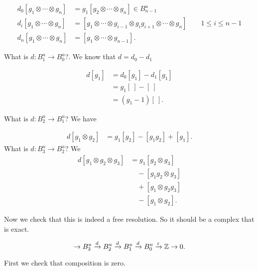 \begin{align*}
    d_0[g_1 \otimes \cdots \otimes g_n] &= g_1 [ g_2 \otimes \cdots \otimes g_n] \in B^u_{n-1}\\
    d_i[g_1 \otimes \cdots \otimes g_n] &= [g_1 \otimes \cdots \otimes g_{i-1} \otimes g_i g_{i+1} \otimes \cdots \otimes g_n] \qquad 1 \le i \le  n-1\\
    d_n[g_1 \otimes \cdots \otimes g_n] &= [g_1 \otimes \cdots \otimes g_{n-1}]
.\end{align*}

\begin{eg}
    What is $d: B^u_1 \to  B^u_0$?. We know that $d = d_0 - d_1$

    \begin{align*}
        d[g_1] &= d_0 [g_1] - d_1[g_1]\\
               &= g_1[\ ] - [\ ]\\
               &= (g_1 - 1)[\ ]
    .\end{align*} 

    What is $d: B^u_2 \to  B^u_1$? We have
    
    \begin{align*}
        d[g_1 \otimes g_2] &= g_1 [g_2] - [g_1 g_2] + [g_1]
    .\end{align*}
    What is $d: B^u_3 \to  B^u_2$? We 
    \begin{align*}
        d[g_1 \otimes g_2 \otimes g_3] &= g_1[g_2 \otimes g_3]\\
                                       &\quad  - [g_1g_2 \otimes g_3]\\
                                       &\quad + [g_1 \otimes g_2 g_3]\\
                                       &\quad - [g_1 \otimes g_2]
    .\end{align*}
\end{eg}        

Now we check that this is indeed a free resolution. So it should be a complex that is exact.

\[
    \to  B^u_3 
    \xrightarrow{d}  B^u_2
    \xrightarrow{d}  B^u_1
    \xrightarrow{d}  B^u_0
    \xrightarrow{\varepsilon} \mathbb{Z}
    \to  0
.\] 

First we check that composition is zero.

